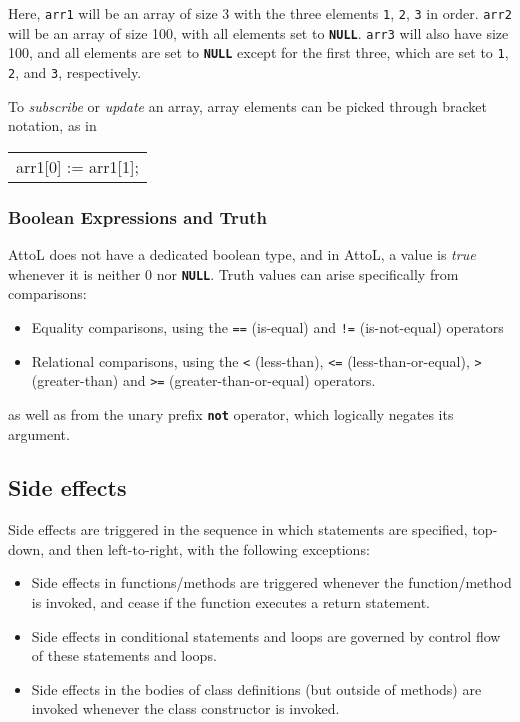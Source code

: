 \documentclass[11pt,a4paper]{article}
\newenvironment{slisting}{%
        \begin{tt}%
        \begin{tabular}{l}%
        }
        {%
        \end{tabular}%
        \end{tt}%
        }
\newcommand{\Ckw}[1]{\textbf{\texttt{#1}}}
\begin{document}
Here, \texttt{arr1} will be an array of size 3 with the three elements \texttt{1}, \texttt{2}, \texttt{3} in order.  \texttt{arr2}
will be an array of size 100, with all elements set to \Ckw{NULL}.  \texttt{arr3} will also have size 100,
and all elements are set to \Ckw{NULL} except for the first three, which are set to \texttt{1}, \texttt{2}, and \texttt{3}, respectively.

To \emph{subscribe} or \emph{update} an array, array elements can be picked through bracket notation, as in
\begin{slisting}
arr1[0] := arr1[1];
\end{slisting}

\subsubsection{Boolean Expressions and Truth}\label{sec:truth}
AttoL does not have a dedicated boolean type, and in AttoL, a value is \emph{true} whenever
it is neither 0 nor \Ckw{NULL}.  Truth values can arise specifically from comparisons:
\begin{itemize}
\item Equality comparisons, using the \texttt{==} (is-equal) and \texttt{!=} (is-not-equal) operators
\item Relational comparisons, using the \texttt{<} (less-than), \texttt{<=} (less-than-or-equal),
   \texttt{>} (greater-than) and \texttt{>=} (greater-than-or-equal) operators.
\end{itemize}
as well as from the unary prefix \Ckw{not} operator, which logically negates its argument.

\subsection{Side effects}
Side effects are triggered in the sequence in which statements are specified, top-down, and then left-to-right,
with the following exceptions:
\begin{itemize}
\item Side effects in functions/methods are triggered whenever the function/method is invoked, and cease if the function executes a return statement.
\item Side effects in conditional statements and loops are governed by control flow of these statements and loops.
\item Side effects in the bodies of class definitions (but outside of methods) are invoked whenever the class constructor is invoked.
\end{itemize}
\end{document}
